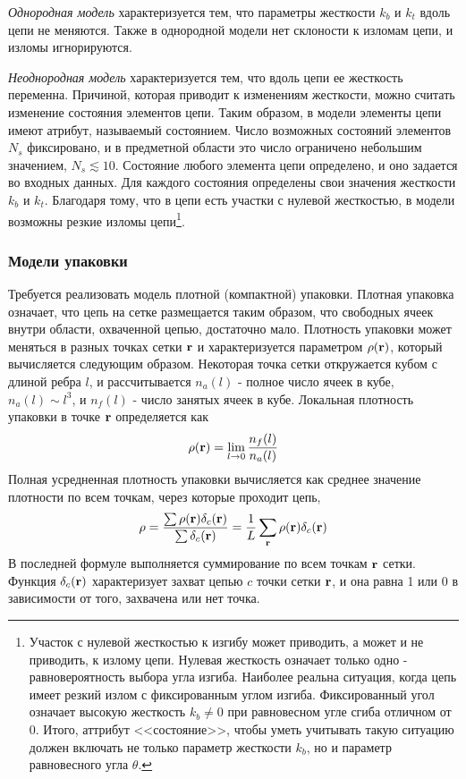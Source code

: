 \documentclass[tikz,a4paper]{scrartcl} %
\begin{document}
\textit{Однородная модель} характеризуется тем, что параметры жесткости $k_b$ и $k_t$ вдоль цепи не меняются. Также в однородной модели нет склоности к изломам цепи, и изломы игнорируются.

\textit{Неоднородная модель} характеризуется тем, что вдоль цепи ее жесткость переменна. Причиной, которая приводит к изменениям жесткости, можно считать изменение состояния элементов цепи. Таким образом, в модели элементы цепи имеют атрибут, называемый состоянием. Число возможных состояний элементов $N_s$ фиксировано, и в предметной области это число ограничено небольшим значением, $N_s \lesssim 10$. Состояние любого элемента цепи определено, и оно  задается во входных данных. Для каждого состояния определены свои значения жесткости $k_b$ и $k_t$. Благодаря тому, что в цепи есть участки с нулевой жесткостью, в модели возможны резкие изломы цепи\footnote{Участок с нулевой жесткостью к изгибу может приводить, а может и не приводить, к излому цепи. Нулевая жесткость означает только одно - равновероятность выбора угла изгиба. Наиболее реальна ситуация, когда цепь имеет резкий излом с фиксированным углом изгиба. Фиксированный угол означает высокую жесткость $k_b \neq 0$ при равновесном угле сгиба отличном от 0. Итого, аттрибут <<состояние>>, чтобы уметь учитывать такую ситуацию должен включать не только параметр жесткости $k_b$, но и параметр равновесного угла $\theta$.}.

\subsubsection*{Модели упаковки}
Требуется реализовать модель плотной (компактной) упаковки. Плотная упаковка означает, что цепь на сетке размещается таким образом, что свободных ячеек внутри области, охваченной цепью, достаточно мало. Плотность упаковки может меняться в разных точках сетки $\bold r$ и характеризуется параметром $\rho(\bold r)$, который вычисляется следующим образом. Некоторая точка сетки откружается кубом с длиной ребра $l$, и рассчитывается $n_a(l)$ - полное число ячеек в кубе, $n_a(l) \sim l^3$, и $n_f(l)$ - число занятых ячеек в кубе. Локальная плотность упаковки в точке $\bold r$ определяется как 
\begin{equation}
\rho(\bold r) = \lim_{l\rightarrow 0} \frac{n_f(l)}{n_a(l)} 
\label{eq:local_density}
\end{equation}
Полная усредненная плотность упаковки вычисляется как среднее значение плотности по всем точкам, через которые проходит цепь, 
\begin{equation}
\rho = \frac{\sum \rho(\bold r)\delta_c(\bold r)}{\sum \delta_c(\bold r)} = \frac{1}{L} \sum_{\bold r} \rho(\bold r)\delta_c(\bold r)
\label{eq:density}
\end{equation}
В последней формуле выполняется суммирование по всем точкам $\bold r$ сетки.  Функция $\delta_c(\bold r)$ характеризует захват цепью $c$ точки сетки $\bold r$, и она равна 1 или 0 в зависимости от того, захвачена или нет точка. 
\end{document}
